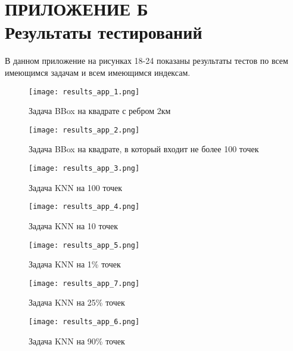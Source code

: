 \chapter*{ПРИЛОЖЕНИЕ Б\\\large \textbf{Результаты тестирований}}
В данном приложение на рисунках 18-24 показаны результаты тестов по всем имеющимся задачам и всем имеющимся индексам. 

\par\vspace{1em}

\begin{figure}[H]
    \centering
    \texttt{[image: results\_app\_1.png]}
    \caption{Задача BBox на квадрате с ребром 2км}
\end{figure}

\par\vspace{1em}

\begin{figure}[H]
    \centering
    \texttt{[image: results\_app\_2.png]}
    \caption{Задача BBox на квадрате, в который входит не более 100 точек}
\end{figure}

\par\vspace{1em}

\begin{figure}[H]
    \centering
    \texttt{[image: results\_app\_3.png]}
    \caption{Задача KNN на 100 точек}
\end{figure}

\par\vspace{1em}

\begin{figure}[H]
    \centering
    \texttt{[image: results\_app\_4.png]}
    \caption{Задача KNN на 10 точек}
\end{figure}

\par\vspace{1em}

\begin{figure}[H]
    \centering
    \texttt{[image: results\_app\_5.png]}
    \caption{Задача KNN на 1\% точек}
\end{figure}

\par\vspace{1em}

\begin{figure}[H]
    \centering
    \texttt{[image: results\_app\_7.png]}
    \caption{Задача KNN на 25\% точек}
\end{figure}

\par\vspace{1em}

\begin{figure}[H]
    \centering
    \texttt{[image: results\_app\_6.png]}
    \caption{Задача KNN на 90\% точек}
\end{figure}
